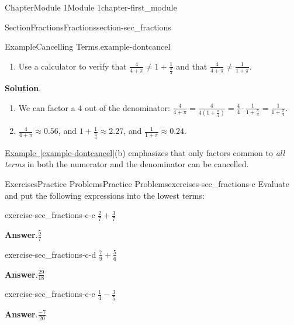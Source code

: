 \documentclass[oneside,10pt,]{book}
\newcommand{\blocktitlefont}{\relax}
\newcommand{\xreffont}{\relax}
\begin{document}
\begin{chapterptx}{Chapter}{Module 1}{}{Module 1}{}{}{chapter-first_module}
\begin{sectionptx}{Section}{Fractions}{}{Fractions}{}{}{section-sec_fractions}
\begin{introduction}{}
\begin{example}{Example}{Cancelling Terms.}{example-dontcancel}
\begin{enumerate}
\item{}Use a calculator to verify that \(\frac{4}{4+\pi}\neq 1 + \displaystyle\frac{1}{\frac{\pi}{4}}\) and that \(\frac{4}{4+\pi}\neq\frac{1}{1+\pi}\).%
\end{enumerate}
\par\smallskip%
\noindent\textbf{\blocktitlefont Solution}.\hypertarget{solution-dontcancel-c}{}\quad{}%
\begin{enumerate}
\item{}We can factor a \(4\) out of the denominator: \(\frac{4}{4+\pi}=\frac{4}{4\left(1+\frac{\pi}{4}\right)}=\frac{4}{4}\cdot\frac{1}{1+\frac{\pi}{4}} = \frac{1}{1+\frac{\pi}{4}}\).%
\item{}\(\frac{4}{4+\pi}\approx 0.56\), and \(1+\frac{1}{\frac{\pi}{4}}\approx2.27\), and \(\frac{1}{1+\pi}\approx0.24\).%
\end{enumerate}
\end{example}
\hyperref[example-dontcancel]{Example~{\xreffont\ref{example-dontcancel}}}(b) emphasizes that only factors common to \emph{all terms} in both the numerator and the denominator can be cancelled.%
\end{introduction}%
%
%
\typeout{************************************************}
\typeout{************************************************}
%
\begin{exercises-subsection-numberless}{Exercises}{Practice Problems}{}{Practice Problems}{}{}{exercises-sec_fractions-c}
Evaluate and put the following expressions into the lowest terms:%
\begin{divisionexercise}{1}{}{}{exercise-sec_fractions-c-c}%
\(\frac{2}{7} + \frac{3}{7}\)%
\par\smallskip%
\noindent\textbf{\blocktitlefont Answer}.\hypertarget{answer-sec_fractions-c-c-b}{}\quad{}\(\frac{5}{7}\)%
\end{divisionexercise}%
\begin{divisionexercise}{2}{}{}{exercise-sec_fractions-c-d}%
\(\frac{7}{9} + \frac{5}{6}\)%
\par\smallskip%
\noindent\textbf{\blocktitlefont Answer}.\hypertarget{answer-sec_fractions-c-d-b}{}\quad{}\(\frac{29}{18}\)%
\end{divisionexercise}%
\begin{divisionexercise}{3}{}{}{exercise-sec_fractions-c-e}%
\(\frac{1}{4} - \frac{3}{5}\)%
\par\smallskip%
\noindent\textbf{\blocktitlefont Answer}.\hypertarget{answer-sec_fractions-c-e-b}{}\quad{}\(\frac{-7}{20}\)%

\end{divisionexercise}
\end{exercises-subsection-numberless}
\end{sectionptx}
\end{chapterptx}
\end{document}
